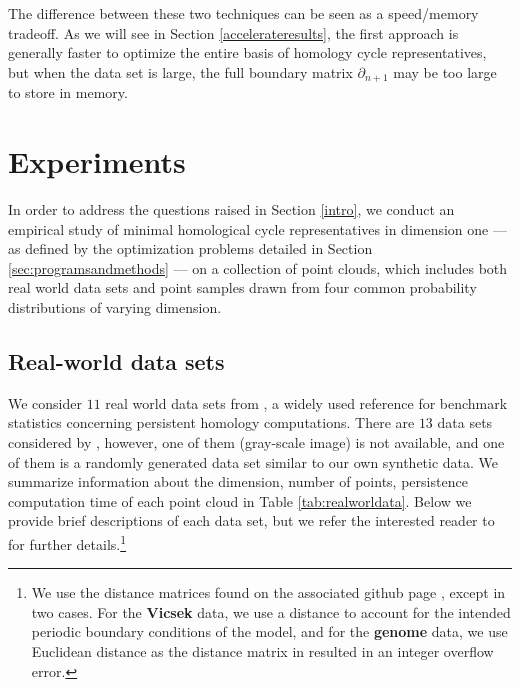 \documentclass[11pt,onecolumn]{article}
\newcommand{\se}{Section }
\theoremstyle{plain}
\theoremstyle{definition}
\begin{document}
The difference between these two techniques can be seen as a speed/memory tradeoff.  As we will see in \se \ref{accelerateresults}, the first approach is generally faster to optimize the entire basis of homology cycle representatives, but when the data set is large, the full boundary matrix $\partial_{n+1}$ may be too large to store in memory. 


\section{Experiments}\label{methods}


In order to address the questions raised in \se \ref{intro}, we conduct an empirical study of minimal homological cycle representatives in dimension one --- as defined by the optimization problems detailed in Section \ref{sec:programsandmethods} --- on a collection of point clouds, which includes both real world data sets and point samples drawn from four common probability distributions of varying dimension.  
\newcommand{\sample}{\mathbf{S}}


\subsection{Real-world data sets} \label{sec: realworlddata}


We consider $11$ real world data sets from \cite{roadmap2017}, a widely used reference for benchmark statistics concerning persistent homology computations. There are $13$ data sets considered by \cite{roadmap2017}, however, one of them (gray-scale image) is not available, and one of them is a randomly generated data set 
similar to our own synthetic data. We summarize information about the dimension, number of points, persistence computation time of each point cloud in Table \ref{tab:realworldata}. Below we provide brief descriptions of each data set, but we refer the interested reader to \cite{roadmap2017} for further details.\footnote{We use the distance matrices found on the associated github page \cite{roadmapgithub}, except in two cases. For the \textbf{Vicsek} data, we use a distance to account for the intended periodic boundary conditions of the model, and for the \textbf{genome} data, we use Euclidean distance as the distance matrix in \cite{roadmapgithub} resulted in an integer overflow error.}
\end{document}
